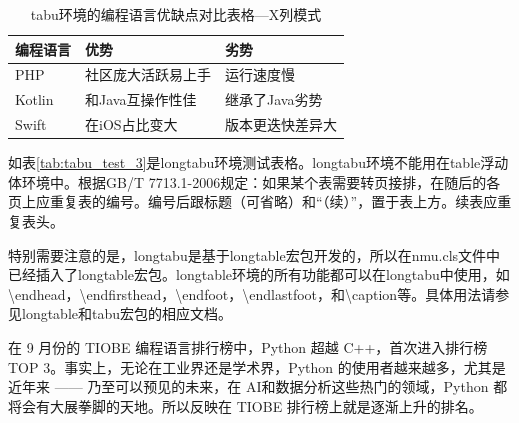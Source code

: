 \begin{table}[htb]
	\centering
	\caption{tabu环境的编程语言优缺点对比表格---X列模式}\label{tab:tabu_test_2}
	\begin{tabu} to 0.6\linewidth{X[1]X[2]X[2]}
		\toprule
		\textbf{编程语言}     & \textbf{优势} & \textbf{劣势} \\
		\midrule
		PHP     & 社区庞大活跃易上手  & 运行速度慢 \\
		Kotlin     & 和Java互操作性佳    & 继承了Java劣势 \\
		Swift     & 在iOS占比变大 & 版本更迭快差异大 \\
		\bottomrule
	\end{tabu}%
\end{table}

如表\ref{tab:tabu_test_3}是longtabu环境测试表格。longtabu环境不能用在table浮动体环境中。根据GB/T 7713.1-2006规定：如果某个表需要转页接排，在随后的各页上应重复表的编号。编号后跟标题（可省略）和“（续）”，置于表上方。续表应重复表头。

特别需要注意的是，longtabu是基于longtable宏包开发的，所以在nmu.cls文件中已经插入了longtable宏包。longtable环境的所有功能都可以在longtabu中使用，如\textbackslash endhead，\textbackslash endfirsthead，\textbackslash endfoot，\textbackslash endlastfoot，和\textbackslash caption等。具体用法请参见longtable和tabu宏包的相应文档。

在 9 月份的 TIOBE 编程语言排行榜中，Python 超越 C++，首次进入排行榜 TOP 3。事实上，无论在工业界还是学术界，Python 的使用者越来越多，尤其是近年来 —— 乃至可以预见的未来，在 AI和数据分析这些热门的领域，Python 都将会有大展拳脚的天地。所以反映在 TIOBE 排行榜上就是逐渐上升的排名。

